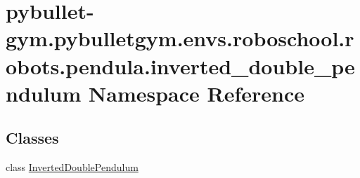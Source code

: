 \hypertarget{namespacepybullet-gym_1_1pybulletgym_1_1envs_1_1roboschool_1_1robots_1_1pendula_1_1inverted__double__pendulum}{}\section{pybullet-\/gym.pybulletgym.\+envs.\+roboschool.\+robots.\+pendula.\+inverted\+\_\+double\+\_\+pendulum Namespace Reference}
\label{namespacepybullet-gym_1_1pybulletgym_1_1envs_1_1roboschool_1_1robots_1_1pendula_1_1inverted__double__pendulum}
\subsection*{Classes}
\begin{DoxyCompactItemize}
\item 
class \hyperlink{classpybullet-gym_1_1pybulletgym_1_1envs_1_1roboschool_1_1robots_1_1pendula_1_1inverted__double_632710b238162c34f237573ee2b501d2}{Inverted\+Double\+Pendulum}
\end{DoxyCompactItemize}
